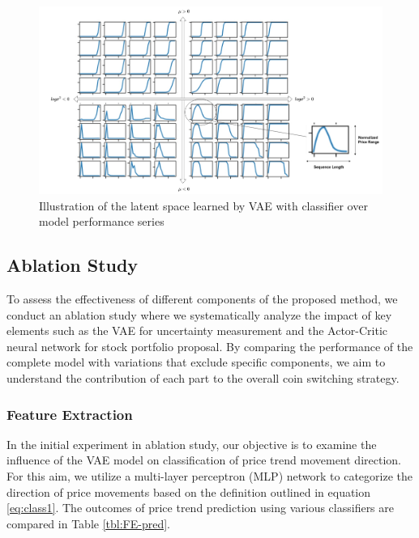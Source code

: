 \begin{figure}[h]
	\centering
	\includegraphics[scale=0.25]{./LatentSpace.jpg}
	\caption{Illustration of the latent space learned by VAE with classifier over model performance series}
	\label{fig:latent_full}
\end{figure}


\subsection{Ablation Study}

To assess the effectiveness of different components of the proposed method, we conduct an ablation study where we systematically analyze the impact of key elements such as the VAE for uncertainty measurement and the Actor-Critic neural network for stock portfolio proposal. By comparing the performance of the complete model with variations that exclude specific components, we aim to understand the contribution of each part to the overall coin switching strategy.

\subsubsection{Feature Extraction}
In the initial experiment in ablation study, our objective is to examine the influence of the VAE model on classification of price trend movement direction. For this aim, we utilize a multi-layer perceptron (MLP) network to categorize the direction of price movements based on the definition outlined in equation \eqref{eq:class1}. The outcomes of price trend prediction using various classifiers are compared in Table \ref{tbl:FE-pred}.

